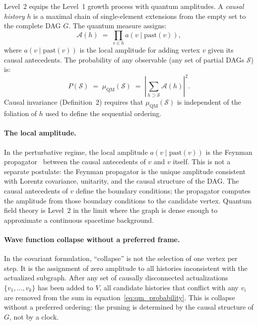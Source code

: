\documentclass[11pt,a4paper]{article}
\theoremstyle{plain}
\theoremstyle{definition}
\theoremstyle{remark}
\newcommand{\muC}{\mu_{\mathrm{QM}}}   %
\begin{document}
Level~2 equips the Level~1 growth process with quantum amplitudes. A
\emph{causal history} $h$ is a maximal chain of single-element extensions
from the empty set to the complete DAG $G$. The quantum measure assigns:
\begin{equation}
  \mathcal{A}(h) \;=\; \prod_{v \in h} a(v \mid \mathrm{past}(v)),
  \label{eq:local_amplitude}
\end{equation}
where $a(v \mid \mathrm{past}(v))$ is the local amplitude for adding vertex
$v$ given its causal antecedents. The probability of any observable
(any set of partial DAGs $\mathcal{S}$) is:
\begin{equation}
  P(\mathcal{S}) \;=\; \muC(\mathcal{S})
  \;=\; \left|\sum_{h \supset \mathcal{S}} \mathcal{A}(h)\right|^2.
  \label{eq:qm_probability}
\end{equation}
Causal invariance (Definition~2) requires that $\muC(\mathcal{S})$ is
independent of the foliation of $h$ used to define the sequential ordering.

\paragraph{The local amplitude.}
In the perturbative regime, the local amplitude $a(v \mid \mathrm{past}(v))$
is the Feynman propagator~\citep{Feynman1948} between the causal antecedents of $v$ and $v$ itself.
This is not a separate postulate: the Feynman propagator is the unique
amplitude consistent with Lorentz covariance, unitarity, and the causal
structure of the DAG. The causal antecedents of $v$ define the boundary
conditions; the propagator computes the amplitude from those boundary conditions
to the candidate vertex. Quantum field theory is Level~2 in the limit where
the graph is dense enough to approximate a continuous spacetime background.

\paragraph{Wave function collapse without a preferred frame.}
In the covariant formulation, ``collapse'' is not the selection of one vertex
per step. It is the assignment of zero amplitude to all histories inconsistent
with the actualized subgraph. After any set of causally disconnected
actualizations $\{v_1, \ldots, v_k\}$ has been added to $V$, all candidate
histories that conflict with any $v_i$ are removed from the sum in
equation~\eqref{eq:qm_probability}. This is collapse without a preferred
ordering: the pruning is determined by the causal structure of $G$, not by
a clock.
\end{document}
